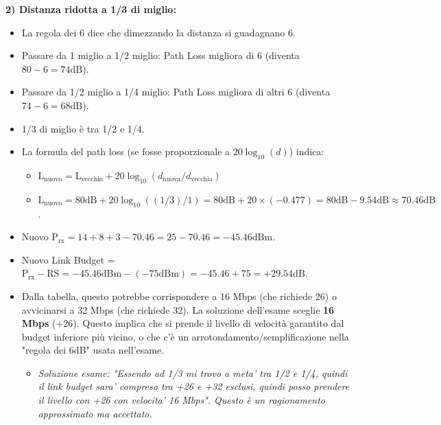 \textbf{2) Distanza ridotta a 1/3 di miglio:}
\begin{itemize}
    \item La regola dei 6 dice che dimezzando la distanza si guadagnano 6.
    \item Passare da 1 miglio a 1/2 miglio: Path Loss migliora di 6 (diventa $80 - 6 = 74\text{dB}$).
    \item Passare da 1/2 miglio a 1/4 miglio: Path Loss migliora di altri 6 (diventa $74 - 6 = 68\text{dB}$).
    \item 1/3 di miglio è tra 1/2 e 1/4.
    \item La formula del path loss (se fosse proporzionale a $20\log_{10}(d)$) indica:
    \begin{itemize}
        \item $\text{L}_{\text{nuovo}} = \text{L}_{\text{vecchio}} + 20\log_{10}(d_{\text{nuova}} / d_{\text{vecchia}})$
        \item $\text{L}_{\text{nuovo}} = 80\text{dB} + 20\log_{10}( (1/3) / 1 ) = 80\text{dB} + 20 \times (-0.477) = 80\text{dB} - 9.54\text{dB} \approx 70.46\text{dB}$.
    \end{itemize}
    \item Nuovo $\text{P}_{\text{rx}} = 14 + 8 + 3 - 70.46 = 25 - 70.46 = -45.46\text{dBm}$.
    \item Nuovo Link Budget = $\text{P}_{\text{rx}} - \text{RS} = -45.46\text{dBm} - (-75\text{dBm}) = -45.46 + 75 = +29.54\text{dB}$.
    \item Dalla tabella, questo potrebbe corrispondere a 16 Mbps (che richiede 26) o avvicinarsi a 32 Mbps (che richiede 32). La soluzione dell'esame sceglie \textbf{16 Mbps} (+26). Questo implica che si prende il livello di velocità garantito dal budget inferiore più vicino, o che c'è un arrotondamento/semplificazione nella "regola dei 6dB" usata nell'esame.
    \begin{itemize}
        \item \textit{Soluzione esame: "Essendo ad 1/3 mi trovo a meta' tra 1/2 e 1/4, quindi il link budget sara' compreso tra +26 e +32 esclusi, quindi posso prendere il livello con +26 con velocita' 16 Mbps". Questo è un ragionamento approssimato ma accettato.}
    \end{itemize}
\end{itemize}

